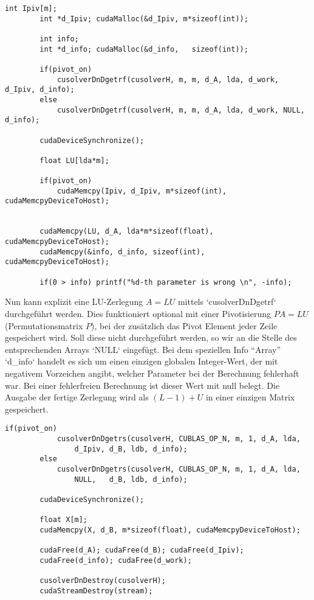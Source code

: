		\begin{lstlisting}[caption=cuSOLVER: LU-Zerlegung]
		int Ipiv[m];
		int *d_Ipiv; cudaMalloc(&d_Ipiv, m*sizeof(int));
		
		int info;
		int *d_info; cudaMalloc(&d_info,   sizeof(int));
		
		if(pivot_on)
		    cusolverDnDgetrf(cusolverH, m, m, d_A, lda, d_work, d_Ipiv, d_info);
		else
		    cusolverDnDgetrf(cusolverH, m, m, d_A, lda, d_work, NULL, d_info);
		    
		cudaDeviceSynchronize();

		float LU[lda*m];
		
		if(pivot_on) 
			cudaMemcpy(Ipiv, d_Ipiv, m*sizeof(int), cudaMemcpyDeviceToHost);
			
			
		cudaMemcpy(LU, d_A, lda*m*sizeof(float), cudaMemcpyDeviceToHost);
		cudaMemcpy(&info, d_info, sizeof(int), cudaMemcpyDeviceToHost);

		if(0 > info) printf("%d-th parameter is wrong \n", -info);
		\end{lstlisting}
		
		Nun kann explizit eine LU-Zerlegung $A = LU$ mittels \li`cusolverDnDgetrf` durchgeführt werden. Dies funktioniert optional mit einer Pivotisierung $PA = LU$ (Permutationsmatrix $P$), bei der zusätzlich das Pivot Element jeder Zeile gespeichert wird. Soll diese nicht durchgeführt werden, so wir an die Stelle des entsprechenden Arrays \li`NULL` eingefügt. Bei dem speziellen Info \enquote{Array} \li`d_info` handelt es sich um einen einzigen globalen Integer-Wert, der mit negativem Vorzeichen angibt, welcher Parameter bei der Berechnung fehlerhaft war. Bei einer fehlerfreien Berechnung ist dieser Wert mit null belegt. Die Ausgabe der fertige Zerlegung wird als $(L-1)+U$ in einer einzigen Matrix gespeichert.
		
		\begin{lstlisting}[caption=cuSOLVER: Gleichungssystem lösen]
		if(pivot_on) 
			cusolverDnDgetrs(cusolverH, CUBLAS_OP_N, m, 1, d_A, lda, 
			    d_Ipiv, d_B, ldb, d_info);
		else         
			cusolverDnDgetrs(cusolverH, CUBLAS_OP_N, m, 1, d_A, lda, 
			    NULL,   d_B, ldb, d_info);
			
		cudaDeviceSynchronize();

		float X[m];
		cudaMemcpy(X, d_B, m*sizeof(float), cudaMemcpyDeviceToHost);

		cudaFree(d_A); cudaFree(d_B); cudaFree(d_Ipiv);
		cudaFree(d_info); cudaFree(d_work);

		cusolverDnDestroy(cusolverH);
		cudaStreamDestroy(stream);
		\end{lstlisting}
		
